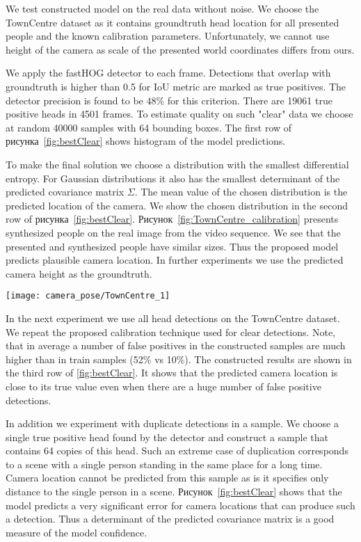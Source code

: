 We test constructed model on the real data without noise. We choose the TownCentre dataset \cite{benfold2011stable} as it contains groundtruth head location for all presented people and the known calibration parameters. Unfortunately, we cannot use height of the camera as scale of the presented world coordinates differs from ours.

We apply the fastHOG detector \cite{prisacariu2009fasthog} to each frame. Detections that overlap with groundtruth is higher than 0.5 for IoU metric are marked as true positives. The detector precision is found to be $48\%$ for this criterion. There are 19061 true positive heads in 4501 frames. To estimate quality on such "clear" data we choose at random 40000 samples with 64 bounding boxes. The first row of рисунка~\ref{fig:bestClear} shows histogram of the model predictions.

To make the final solution we choose a distribution with the smallest differential entropy. For Gaussian distributions it also has the smallest determinant of the predicted covariance matrix $\Sigma$. The mean value of the chosen distribution is the predicted location of the camera. We show the chosen distribution in the second row of рисунка~\ref{fig:bestClear}. Рисунок~\ref{fig:TownCentre_calibration} presents synthesized people on the real image from the video sequence. We see that the presented and synthesized people have similar sizes. Thus the proposed model predicts plausible camera location. In further experiments we use the predicted camera height as the groundtruth.

\begin{figure*}[!t]
	\centering
	\texttt{[image: camera\_pose/TownCentre\_1]}
	\caption{Визуализация синтезированных людей на предсказанной плоскости земли.}
	\label{fig:TownCentre_calibration}
\end{figure*}

In the next experiment we use all head detections on the TownCentre dataset. We repeat the proposed calibration technique used for clear detections. Note, that in average a number of false positives in the constructed samples are much higher than in train samples (52\% vs 10\%). The constructed results are shown in the third row of \ref{fig:bestClear}. It shows that the predicted camera location is close to its true value even when there are a huge number of false positive detections.

In addition we experiment with duplicate detections in a sample. We choose a single true positive head found by the detector and construct a sample that contains 64 copies of this head. Such an extreme case of duplication corresponds to a scene with a single person standing in the same place for a long time. Camera location cannot be predicted from this sample as is it specifies only distance to the single person in a scene. Рисунок~\ref{fig:bestClear} shows that the model predicts a very significant error for camera locations that can produce such a detection. Thus a determinant of the predicted covariance matrix is a good measure of the model confidence.


